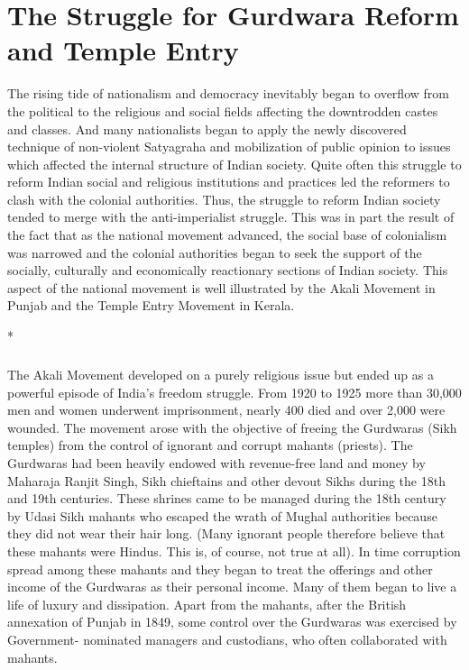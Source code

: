 \chapter[Struggle for Gurdwara Reform and Temple Entry]{The Struggle for Gurdwara Reform and Temple Entry}

The rising tide of nationalism and democracy inevitably began to overflow from the political to the religious and social fields affecting the downtrodden castes and classes. And many nationalists began to apply the newly discovered technique of non-violent Satyagraha and mobilization of public opinion to issues which affected the internal structure of Indian society. Quite often this struggle to reform Indian social and religious institutions and practices led the reformers to clash with the colonial authorities. Thus, the struggle to reform Indian society tended to merge with the anti-imperialist struggle. This was in part the result of the fact that as the national movement advanced, the social base of colonialism was narrowed and the colonial authorities began to seek the support of the socially, culturally and economically reactionary sections of Indian society. This aspect of the national movement is well illustrated by the Akali Movement in Punjab and the Temple Entry Movement in Kerala.

\begin{center}*\end{center}

\paragraph*{}

The Akali Movement developed on a purely religious issue but ended up as a powerful episode of India's freedom struggle. From 1920 to 1925 more than 30,000 men and women underwent imprisonment, nearly 400 died and over 2,000 were wounded. The movement arose with the objective of freeing the Gurdwaras (Sikh temples) from the control of ignorant and corrupt mahants (priests). The Gurdwaras had been heavily endowed with revenue-free land and money by Maharaja Ranjit Singh, Sikh chieftains and other devout Sikhs during the 18th and 19th centuries. These shrines came to be managed during the 18th century by Udasi Sikh mahants who escaped the wrath of Mughal authorities because they did not wear their hair long. (Many ignorant people therefore believe that these mahants were Hindus. This is, of course, not true at all). In time corruption spread among these mahants and they began to treat the offerings and other income of the Gurdwaras as their personal income. Many of them began to live a life of luxury and dissipation. Apart from the mahants, after the British annexation of Punjab in 1849, some control over the Gurdwaras was exercised by Government- nominated managers and custodians, who often collaborated with mahants.

